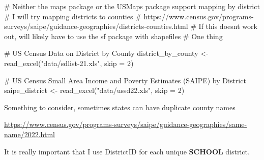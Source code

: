 \documentclass[
  letterpaper,
  DIV=11,
  numbers=noendperiod]{scrartcl}
\newenvironment{Shaded}{\begin{snugshade}}{\end{snugshade}}
\newcommand{\AttributeTok}[1]{\textcolor[rgb]{0.40,0.45,0.13}{#1}}
\newcommand{\CommentTok}[1]{\textcolor[rgb]{0.37,0.37,0.37}{#1}}
\newcommand{\DecValTok}[1]{\textcolor[rgb]{0.68,0.00,0.00}{#1}}
\newcommand{\FunctionTok}[1]{\textcolor[rgb]{0.28,0.35,0.67}{#1}}
\newcommand{\NormalTok}[1]{\textcolor[rgb]{0.00,0.23,0.31}{#1}}
\newcommand{\OtherTok}[1]{\textcolor[rgb]{0.00,0.23,0.31}{#1}}
\newcommand{\StringTok}[1]{\textcolor[rgb]{0.13,0.47,0.30}{#1}}
\begin{document}
\begin{Shaded}
\begin{Highlighting}[]
\CommentTok{\# Neither the maps package or the USMaps package support mapping by district}
\CommentTok{\# I will try mapping districts to counties}
\CommentTok{\# https://www.census.gov/programs{-}surveys/saipe/guidance{-}geographies/districts{-}counties.html}
\CommentTok{\# If this doesn\textquotesingle{}t work out, will likely have to use the sf package with shapefiles}
\CommentTok{\# One thing }

\CommentTok{\# US Census Data on District by County}
\NormalTok{district\_by\_county }\OtherTok{\textless{}{-}} \FunctionTok{read\_excel}\NormalTok{(}\StringTok{"data/sdlist{-}21.xls"}\NormalTok{, }\AttributeTok{skip =} \DecValTok{2}\NormalTok{)}

\CommentTok{\# US Census Small Area Income and Poverty Estimates (SAIPE) by District}
\NormalTok{saipe\_district }\OtherTok{\textless{}{-}} \FunctionTok{read\_excel}\NormalTok{(}\StringTok{"data/ussd22.xls"}\NormalTok{, }\AttributeTok{skip =} \DecValTok{2}\NormalTok{)}
\end{Highlighting}
\end{Shaded}

Something to consider, sometimes states can have duplicate county names

\url{https://www.census.gov/programs-surveys/saipe/guidance-geographies/same-name/2022.html}

It is really important that I use DistrictID for each unique
\textbf{SCHOOL} district.
\end{document}
